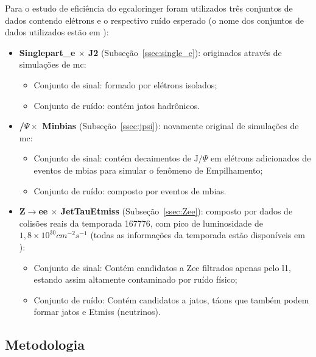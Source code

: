 Para o estudo de eficiência do \gls{egcaloringer} foram utilizados três
conjuntos de dados contendo elétrons e o respectivo ruído esperado
(o nome dos conjuntos de dados utilizados estão em \cite{portal_caloringer}):
\begin{itemize}
\item \textbf{Singlepart\_e $\times$ J2} (Subseção~\ref{ssec:single_e}): originados através de simulações de
\gls{mc}:
\begin{itemize}
\item Conjunto de sinal: formado por elétrons isolados;
\item Conjunto de ruído: contém jatos hadrônicos.
\end{itemize}
\item \textbf{/$\Psi \times$ Minbias} (Subseção~\ref{ssec:jpsi}): novamente original de simulações
de \gls{mc}:
\begin{itemize}
\item Conjunto de sinal: contém decaimentos de $\text{J}/\Psi$ em elétrons adicionados de eventos de
\gls{mbias} para simular o fenômeno de Empilhamento;
\item Conjunto de ruído: composto por eventos de \gls{mbias}.
\end{itemize}
\item \textbf{Z$\rightarrow$ee $\times$ JetTauEtmiss} (Subseção~\ref{ssec:Zee}): composto por dados de
colisões reais da temporada 167776, com pico de luminosidade de
$1,8\times10^{30}cm^{-2}s^{-1}$ (todas as informações da temporada estão
disponíveis em \cite{info_run}):
\begin{itemize}
\item Conjunto de sinal: Contém candidatos a Zee filtrados apenas pelo \gls{l1},
estando assim altamente contaminado por ruído físico;
\item Conjunto de ruído: Contém candidatos a jatos, táons que também podem
formar jatos e \gls{Etmiss} (neutrinos).
\end{itemize}
\end{itemize}

\subsection{Metodologia} %
\label{ssec:metodologia}

